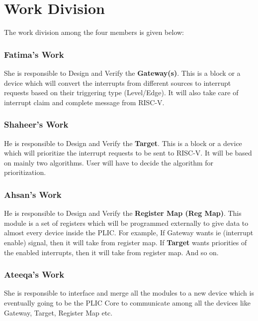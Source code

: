 
\chapter{Work Division}
\label{Chapter9}


The work division among the four members is given below:

\subsection{Fatima's Work}
She is responsible to Design and Verify the \textbf{Gateway(s)}. This is a block or a device which will convert the interrupts from different sources to interrupt requests based on their triggering type (Level/Edge). It will also take care of interrupt claim and complete message from RISC-V. 

\subsection{Shaheer's Work}
He is responsible to Design and Verify the \textbf{Target}. This is a block or a device which will prioritize the interrupt requests to be sent to RISC-V. It will be based on mainly two algorithms. User will have to decide the algorithm for prioritization.

\subsection{Ahsan's Work}
He is responsible to Design and Verify the \textbf{Register Map (Reg Map)}. This module is a set of registers which will be programmed externally to give data to almost every device inside the PLIC. For example, If Gateway wants ie (interrupt enable) signal, then it will take from register map. If \textbf{Target} wants priorities of the enabled interrupts, then it will take from register map. And so on.

\subsection{Ateeqa's Work}
She is responsible to interface and merge all the modules to a new device which is eventually going to be the PLIC Core to communicate among all the devices like Gateway, Target, Register Map etc.

